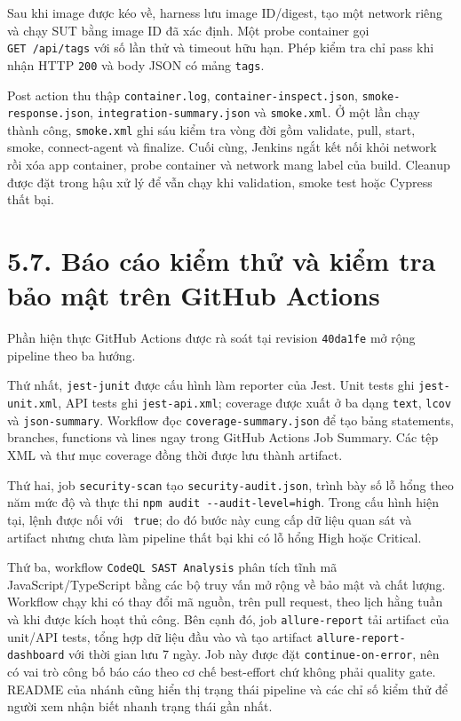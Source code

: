 \documentclass[
  vietnamese,
  12pt,
  a4paper,
  oneside]{report}
\begin{document}
Sau khi image được kéo về, harness lưu image ID/digest, tạo một network
riêng và chạy SUT bằng image ID đã xác định. Một probe container gọi
\texttt{GET\ /api/tags} với số lần thử và timeout hữu hạn. Phép kiểm tra
chỉ pass khi nhận HTTP \texttt{200} và body JSON có mảng \texttt{tags}.

Post action thu thập \texttt{container.log},
\texttt{container-inspect.json}, \texttt{smoke-response.json},
\texttt{integration-summary.json} và \texttt{smoke.xml}. Ở một lần chạy
thành công, \texttt{smoke.xml} ghi sáu kiểm tra vòng đời gồm validate,
pull, start, smoke, connect-agent và finalize. Cuối cùng, Jenkins ngắt
kết nối khỏi network rồi xóa app container, probe container và network
mang label của build. Cleanup được đặt trong hậu xử lý để vẫn chạy khi
validation, smoke test hoặc Cypress thất bại.

\section{5.7. Báo cáo kiểm thử và kiểm tra bảo mật trên GitHub
Actions}\label{57-buxe1o-cuxe1o-kiux1ec3m-thux1eed-vuxe0-kiux1ec3m-tra-bux1ea3o-mux1eadt-truxean-github-actions}

Phần hiện thực GitHub Actions được rà soát tại revision \texttt{40da1fe}
mở rộng pipeline theo ba hướng.

Thứ nhất, \texttt{jest-junit} được cấu hình làm reporter của Jest. Unit
tests ghi \texttt{jest-unit.xml}, API tests ghi \texttt{jest-api.xml};
coverage được xuất ở ba dạng \texttt{text}, \texttt{lcov} và
\texttt{json-summary}. Workflow đọc \texttt{coverage-summary.json} để
tạo bảng statements, branches, functions và lines ngay trong GitHub
Actions Job Summary. Các tệp XML và thư mục coverage đồng thời được lưu
thành artifact.

Thứ hai, job \texttt{security-scan} tạo \texttt{security-audit.json},
trình bày số lỗ hổng theo năm mức độ và thực thi
\texttt{npm\ audit\ -\/-audit-level=high}. Trong cấu hình hiện tại, lệnh
được nối với \texttt{\textbar{}\textbar{}\ true}; do đó bước này cung
cấp dữ liệu quan sát và artifact nhưng chưa làm pipeline thất bại khi có
lỗ hổng High hoặc Critical.

Thứ ba, workflow \texttt{CodeQL\ SAST\ Analysis} phân tích tĩnh mã
JavaScript/TypeScript bằng các bộ truy vấn mở rộng về bảo mật và chất
lượng. Workflow chạy khi có thay đổi mã nguồn, trên pull request, theo
lịch hằng tuần và khi được kích hoạt thủ công. Bên cạnh đó, job
\texttt{allure-report} tải artifact của unit/API tests, tổng hợp dữ liệu
đầu vào và tạo artifact \texttt{allure-report-dashboard} với thời gian
lưu 7 ngày. Job này được đặt \texttt{continue-on-error}, nên có vai trò
công bố báo cáo theo cơ chế best-effort chứ không phải quality gate.
README của nhánh cũng hiển thị trạng thái pipeline và các chỉ số kiểm
thử để người xem nhận biết nhanh trạng thái gần nhất.
\end{document}
